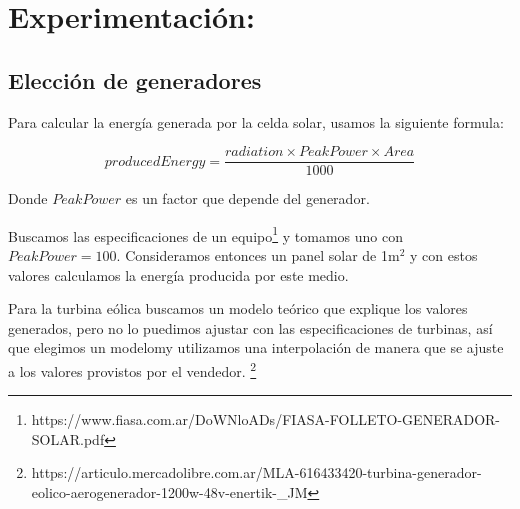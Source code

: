 \section{Experimentación:}

\subsection{Elección de generadores}
Para calcular la energía generada por la celda solar, usamos la siguiente formula:

$$producedEnergy = \frac{radiation \times PeakPower \times Area}{1000}$$

Donde $PeakPower$ es un factor que depende del generador.

Buscamos las especificaciones de un equipo\footnote{https://www.fiasa.com.ar/DoWNloADs/FIASA-FOLLETO-GENERADOR-SOLAR.pdf}  
y tomamos uno con $PeakPower=100$. Consideramos entonces un panel solar de 1m$^2$ y con estos valores calculamos la
energía producida por este medio.

Para la turbina eólica buscamos un modelo teórico que explique los valores generados,
pero no lo puedimos ajustar con las especificaciones de turbinas, así que elegimos un
modelomy utilizamos una interpolación de manera que se ajuste a los valores 
provistos por el vendedor. \footnote{https://articulo.mercadolibre.com.ar/MLA-616433420-turbina-generador-eolico-aerogenerador-1200w-48v-enertik-\_JM}

